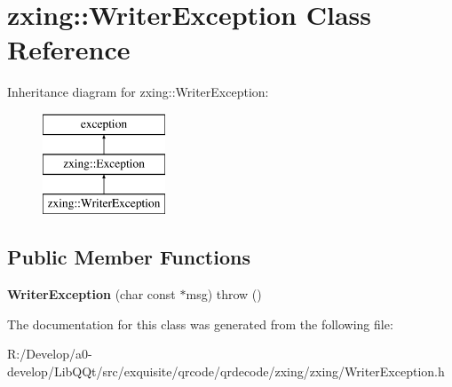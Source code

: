 \hypertarget{classzxing_1_1_writer_exception}{}\section{zxing\+:\+:Writer\+Exception Class Reference}
\label{classzxing_1_1_writer_exception}
Inheritance diagram for zxing\+:\+:Writer\+Exception\+:\begin{figure}[H]
\begin{center}
\leavevmode
\includegraphics[height=3.000000cm]{classzxing_1_1_writer_exception}
\end{center}
\end{figure}
\subsection*{Public Member Functions}
\begin{DoxyCompactItemize}
\item 
\mbox{\label{classzxing_1_1_writer_exception_ad9c6bfdf4af6e9009701ebeaca445e27}} 
{\bfseries Writer\+Exception} (char const $\ast$msg)  throw ()
\end{DoxyCompactItemize}


The documentation for this class was generated from the following file\+:\begin{DoxyCompactItemize}
\item 
R\+:/\+Develop/a0-\/develop/\+Lib\+Q\+Qt/src/exquisite/qrcode/qrdecode/zxing/zxing/Writer\+Exception.\+h\end{DoxyCompactItemize}
